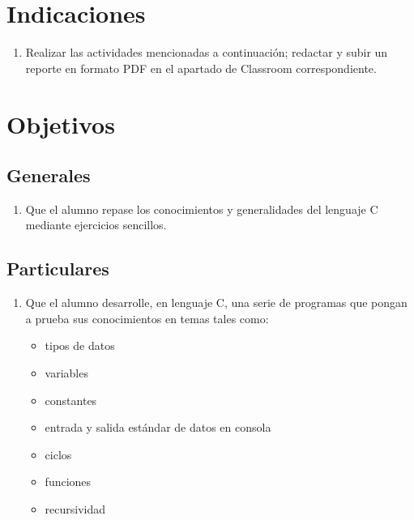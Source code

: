 \documentclass[10pt,letterpaper]{article}
\begin{document}

\section{Indicaciones}
\begin{enumerate}[label=(\roman*)]
    \item Realizar las actividades mencionadas a continuación; redactar y subir un reporte en formato PDF en el apartado de Classroom correspondiente.
\end{enumerate}
\section{Objetivos}
\subsection{Generales}
\begin{enumerate}[label=\arabic*)]
    \item Que el alumno repase los conocimientos y generalidades del lenguaje C mediante ejercicios sencillos.
\end{enumerate}
\subsection{Particulares}
\begin{enumerate}
    \item Que el alumno desarrolle, en lenguaje C, una serie de programas que pongan a prueba sus conocimientos en temas tales como:
    \begin{itemize}
        \item tipos de datos
        \item variables
        \item constantes
        \item entrada y salida estándar de datos en consola
        \item ciclos
        \item funciones
        \item recursividad
    \end{itemize} 
\end{enumerate}
\end{document}
